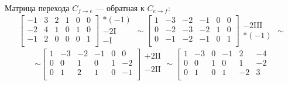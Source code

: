 \begin{enumerate}
	      Матрица перехода $C_{f \to e}$ — обратная к $C_{e \to f}$:
	      \[
		      \left[
			      \begin{array}{ccc|ccc}
				      -1 & 3 & 2 & 1 & 0 & 0 \\
				      -2 & 4 & 1 & 0 & 1 & 0 \\
				      -1 & 2 & 0 & 0 & 0 & 1 \\
			      \end{array}
			      \right]
		      \begin{array}{c}
			      *(-1)       \\
			      -2 \text{I} \\
			      -\text{I}   \\
		      \end{array}
		      \sim
		      \left[
			      \begin{array}{ccc|ccc}
				      1 & -3 & -2 & -1 & 0 & 0 \\
				      0 & -2 & -3 & -2 & 1 & 0 \\
				      0 & -1 & -2 & -1 & 0 & 1 \\
			      \end{array}
			      \right]
		      \begin{array}{c}
			      \\
			      -2 \text{III} \\
			      *(-1)         \\
		      \end{array}
		      \sim
	      \]
	      \[
		      \sim
		      \left[
			      \begin{array}{ccc|ccc}
				      1 & -3 & -2 & -1 & 0 & 0  \\
				      0 & 0  & 1  & 0  & 1 & -2 \\
				      0 & 1  & 2  & 1  & 0 & -1 \\
			      \end{array}
			      \right]
		      \begin{array}{c}
			      +2 \text{II} \\
			      \\
			      -2 \text{II} \\
		      \end{array}
		      \sim
		      \left[
			      \begin{array}{ccc|ccc}
				      1 & -3 & 0 & -1 & 2  & -4 \\
				      0 & 0  & 1 & 0  & 1  & -2 \\
				      0 & 1  & 0 & 1  & -2 & 3  \\
			      \end{array}
\]
\end{enumerate}
